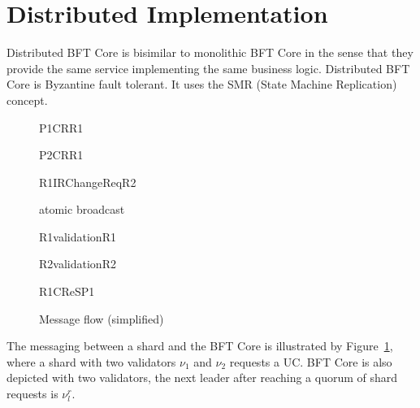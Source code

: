 \section{Distributed Implementation}\label{sec:distributed-bft-core}

Distributed BFT Core is bisimilar to monolithic BFT Core in the sense that they provide the same service implementing the same business logic. Distributed BFT Core is Byzantine fault tolerant. It uses the SMR (State Machine Replication) concept.

\begin{figure}[htb]
	\begin{center}
		\begin{sequencediagram}
			\begin{messcall}{P1}{\qquad CR}{R1}
        \begin{messcall}{P2}{CR}{R1}
          \begin{messcall}{R1}{\qquad IRChangeReq}{R2}
          \begin{sdblock}{atomic broadcast}{}
            \prelevel
          \end{sdblock}
          \begin{call}{R1}{\!\!\!\!validation}{R1}{}
          \end{call}
          \prelevel\prelevel
          \begin{call}{R2}{\!\!\!\!validation}{R2}{}
          \end{call}
        \end{messcall}
        \prelevel
        \begin{messcall}{R1}{\qquad CReS}{P1}
        \end{messcall}
        \prelevel
      \end{messcall}
      \prelevel
    \end{messcall}
		\end{sequencediagram}
		\caption{Message flow (simplified)}\label{fi:rootflow}
	\end{center}
\end{figure}

The messaging between a shard and the BFT Core is illustrated by Figure~\ref{fi:rootflow}, where a shard with two validators $\nu_1$ and $\nu_2$ requests a UC. BFT Core is also depicted with two validators, the next leader after reaching a quorum of shard requests is $\nu^r_l$.

